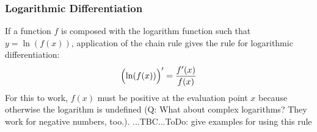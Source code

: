 





\subsubsection{Logarithmic Differentiation} 
If a function $f$ is composed with the logarithm function such that $y = \ln(f(x))$, application of the chain rule gives the rule for logarithmic differentiation:
\begin{equation}
 \Bigl( \ln(f(x)) \Bigr)' = \frac{f'(x)}{f(x)}
\end{equation}
For this to work, $f(x)$ must be positive at the evaluation point $x$ because otherwise the logarithm is undefined (Q: What about complex logarithms? They work for negative numbers, too.). ...TBC...ToDo: give examples for using this rule



